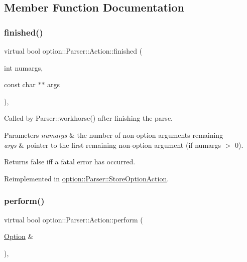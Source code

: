 \subsection{Member Function Documentation}
\mbox{\label{structoption_1_1Parser_1_1Action_a3ec558b51e34d33d116f14587289e032}} 
\subsubsection{\texorpdfstring{finished()}{finished()}}
{\footnotesize\ttfamily virtual bool option\+::\+Parser\+::\+Action\+::finished (\begin{DoxyParamCaption}\item[{int}]{numargs,  }\item[{const char $\ast$$\ast$}]{args }\end{DoxyParamCaption})\hspace{0.3cm}{\ttfamily [inline]}, {\ttfamily [virtual]}}



Called by Parser\+::workhorse() after finishing the parse. 


\begin{DoxyParams}{Parameters}
{\em numargs} & the number of non-\/option arguments remaining \\
\hline
{\em args} & pointer to the first remaining non-\/option argument (if numargs $>$ 0).\\
\hline
\end{DoxyParams}
\begin{DoxyReturn}{Returns}
{\ttfamily false} iff a fatal error has occurred. 
\end{DoxyReturn}


Reimplemented in \hyperlink{classoption_1_1Parser_1_1StoreOptionAction_a617f675ef50a72ae36ce91f065bc8441}{option\+::\+Parser\+::\+Store\+Option\+Action}.

\mbox{\label{structoption_1_1Parser_1_1Action_a176b5f783bb35eb015b6d2c09422457d}} 
\subsubsection{\texorpdfstring{perform()}{perform()}}
{\footnotesize\ttfamily virtual bool option\+::\+Parser\+::\+Action\+::perform (\begin{DoxyParamCaption}\item[{\hyperlink{classoption_1_1Option}{Option} \&}]{ }\end{DoxyParamCaption})\hspace{0.3cm}{\ttfamily [inline]}, {\ttfamily [virtual]}}



